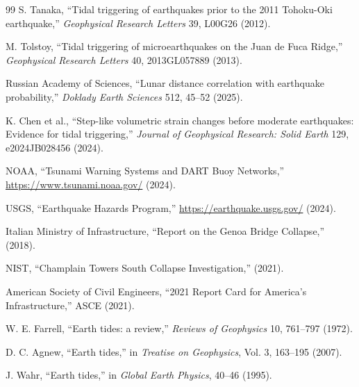 \documentclass[12pt,a4paper]{article}
\theoremstyle{remark}
\begin{document}
\begin{thebibliography}{99}
		S. Tanaka, ``Tidal triggering of earthquakes prior to the 2011 Tohoku-Oki earthquake,'' \emph{Geophysical Research Letters} 39, L00G26 (2012).
		
		M. Tolstoy, ``Tidal triggering of microearthquakes on the Juan de Fuca Ridge,'' \emph{Geophysical Research Letters} 40, 2013GL057889 (2013).
		
		Russian Academy of Sciences, ``Lunar distance correlation with earthquake probability,'' \emph{Doklady Earth Sciences} 512, 45–52 (2025).
		
		K. Chen et al., ``Step-like volumetric strain changes before moderate earthquakes: Evidence for tidal triggering,'' \emph{Journal of Geophysical Research: Solid Earth} 129, e2024JB028456 (2024).
		
		NOAA, ``Tsunami Warning Systems and DART Buoy Networks,'' \url{https://www.tsunami.noaa.gov/} (2024).
		
		USGS, ``Earthquake Hazards Program,'' \url{https://earthquake.usgs.gov/} (2024).
		
		Italian Ministry of Infrastructure, ``Report on the Genoa Bridge Collapse,'' (2018).
		
		NIST, ``Champlain Towers South Collapse Investigation,'' (2021).
		
		American Society of Civil Engineers, ``2021 Report Card for America's Infrastructure,'' ASCE (2021).
		
		W. E. Farrell, ``Earth tides: a review,'' \emph{Reviews of Geophysics} 10, 761–797 (1972).
		
		D. C. Agnew, ``Earth tides,'' in \emph{Treatise on Geophysics}, Vol. 3, 163–195 (2007).
		
		J. Wahr, ``Earth tides,'' in \emph{Global Earth Physics}, 40–46 (1995).
		
	\end{thebibliography}
	
\end{document}
